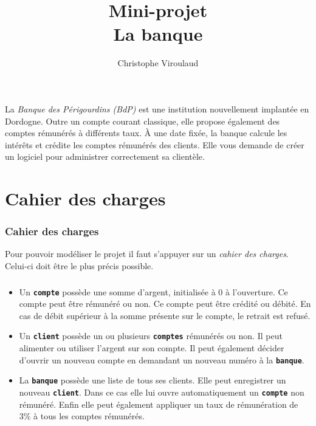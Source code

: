 \documentclass[svgnames,11pt]{beamer}
\author[]{Christophe Viroulaud}
\title{Mini-projet\\La banque}
\date{\framebox{\textbf{Lang 04}}}
\institute{Terminale - NSI}
\begin{document}
\begin{frame}
\titlepage
\end{frame}
\begin{frame}
    \frametitle{}

    La \emph{Banque des Périgourdins (BdP)} est une institution nouvellement implantée en Dordogne. Outre un compte courant classique, elle propose également des comptes rémunérés à différents taux. À une date fixée, la banque calcule les intérêts et crédite les comptes rémunérés des clients. Elle vous demande de créer un logiciel pour administrer correctement sa clientèle.
\end{frame}
\section{Cahier des charges}
\begin{frame}
    \frametitle{Cahier des charges}

    \begin{aretenir}[]
    Pour pouvoir modéliser le projet il faut s'appuyer sur un \emph{cahier des charges}. Celui-ci doit être le plus précis possible.
    \end{aretenir}

\end{frame}
\begin{frame}
    \frametitle{}
    \begin{itemize}
        \item<1-> Un \texttt{\textbf{compte}} possède une somme d'argent, initialisée à 0 à l'ouverture. Ce compte peut être rémunéré ou non. Ce compte peut être crédité ou débité. En cas de débit supérieur à la somme présente sur le compte, le retrait est refusé.
        \item <2-> Un \textbf{\texttt{client}} possède un ou plusieurs \textbf{\texttt{comptes}} rémunérés ou non. Il peut alimenter ou utiliser l'argent sur son compte. Il peut également décider d'ouvrir un nouveau compte en demandant un nouveau numéro à la \textbf{\texttt{banque}}.
        \item <3-> La \textbf{\texttt{banque}} possède une liste de tous ses clients. Elle peut enregistrer un nouveau \textbf{\texttt{client}}. Dans ce cas elle lui ouvre automatiquement un \textbf{\texttt{compte}} non rémunéré. Enfin elle peut également appliquer un taux de rémunération de 3\% à tous les comptes rémunérés.
    \end{itemize}
\end{frame}
\end{document}
